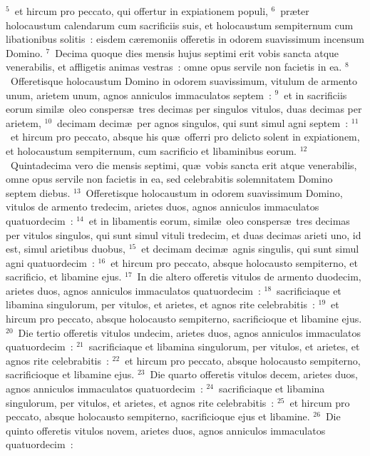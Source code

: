 ${}^{5}$~et hircum pro peccato, qui offertur in expiationem populi,
${}^{6}$~pr\ae ter holocaustum calendarum cum sacrificiis suis, et holocaustum sempiternum cum libationibus solitis~: eisdem c\ae remoniis offeretis in odorem suavissimum incensum Domino.
${}^{7}$~Decima quoque dies mensis hujus septimi erit vobis sancta atque venerabilis, et affligetis animas vestras~: omne opus servile non facietis in ea.
${}^{8}$~Offeretisque holocaustum Domino in odorem suavissimum, vitulum de armento unum, arietem unum, agnos anniculos immaculatos septem~:
${}^{9}$~et in sacrificiis eorum simil\ae\ oleo conspers\ae\ tres decimas per singulos vitulos, duas decimas per arietem,
${}^{10}$~decimam decim\ae\ per agnos singulos, qui sunt simul agni septem~:
${}^{11}$~et hircum pro peccato, absque his qu\ae\ offerri pro delicto solent in expiationem, et holocaustum sempiternum, cum sacrificio et libaminibus eorum.
${}^{12}$~Quintadecima vero die mensis septimi, qu\ae\ vobis sancta erit atque venerabilis, omne opus servile non facietis in ea, sed celebrabitis solemnitatem Domino septem diebus.
${}^{13}$~Offeretisque holocaustum in odorem suavissimum Domino, vitulos de armento tredecim, arietes duos, agnos anniculos immaculatos quatuordecim~:
${}^{14}$~et in libamentis eorum, simil\ae\ oleo conspers\ae\ tres decimas per vitulos singulos, qui sunt simul vituli tredecim, et duas decimas arieti uno, id est, simul arietibus duobus,
${}^{15}$~et decimam decim\ae\ agnis singulis, qui sunt simul agni quatuordecim~:
${}^{16}$~et hircum pro peccato, absque holocausto sempiterno, et sacrificio, et libamine ejus.
${}^{17}$~In die altero offeretis vitulos de armento duodecim, arietes duos, agnos anniculos immaculatos quatuordecim~:
${}^{18}$~sacrificiaque et libamina singulorum, per vitulos, et arietes, et agnos rite celebrabitis~:
${}^{19}$~et hircum pro peccato, absque holocausto sempiterno, sacrificioque et libamine ejus.
${}^{20}$~Die tertio offeretis vitulos undecim, arietes duos, agnos anniculos immaculatos quatuordecim~:
${}^{21}$~sacrificiaque et libamina singulorum, per vitulos, et arietes, et agnos rite celebrabitis~:
${}^{22}$~et hircum pro peccato, absque holocausto sempiterno, sacrificioque et libamine ejus.
${}^{23}$~Die quarto offeretis vitulos decem, arietes duos, agnos anniculos immaculatos quatuordecim~:
${}^{24}$~sacrificiaque et libamina singulorum, per vitulos, et arietes, et agnos rite celebrabitis~:
${}^{25}$~et hircum pro peccato, absque holocausto sempiterno, sacrificioque ejus et libamine.
${}^{26}$~Die quinto offeretis vitulos novem, arietes duos, agnos anniculos immaculatos quatuordecim~:

